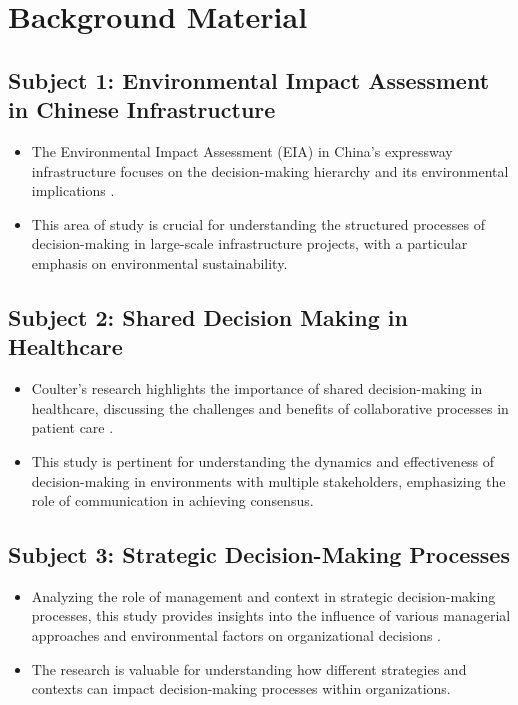 \documentclass[12pt]{article}
\begin{document}
\section{Background Material}

\subsection{Subject 1: Environmental Impact Assessment in Chinese Infrastructure}
\begin{itemize}
  \item The Environmental Impact Assessment (EIA) in China's expressway infrastructure focuses on the decision-making hierarchy and its environmental implications \cite{reference1}.
  \item This area of study is crucial for understanding the structured processes of decision-making in large-scale infrastructure projects, with a particular emphasis on environmental sustainability.
\end{itemize}

\subsection{Subject 2: Shared Decision Making in Healthcare}
\begin{itemize}
  \item Coulter's research highlights the importance of shared decision-making in healthcare, discussing the challenges and benefits of collaborative processes in patient care \cite{reference2}.
  \item This study is pertinent for understanding the dynamics and effectiveness of decision-making in environments with multiple stakeholders, emphasizing the role of communication in achieving consensus.
\end{itemize}

\subsection{Subject 3: Strategic Decision-Making Processes}
\begin{itemize}
  \item Analyzing the role of management and context in strategic decision-making processes, this study provides insights into the influence of various managerial approaches and environmental factors on organizational decisions \cite{reference4}.
  \item The research is valuable for understanding how different strategies and contexts can impact decision-making processes within organizations.
\end{itemize}
\end{document}
